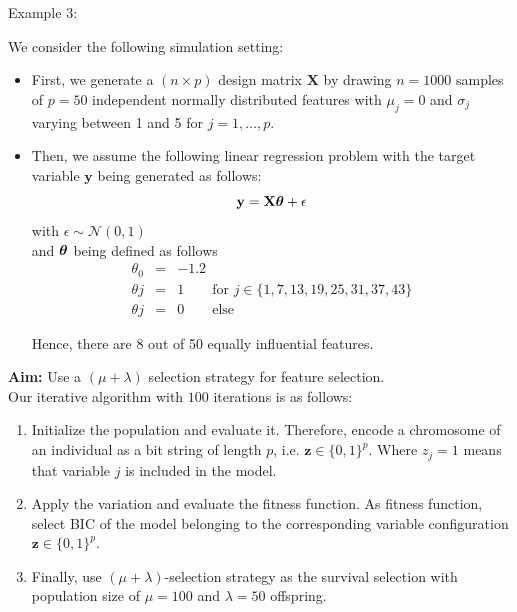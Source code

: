\documentclass[11pt,compress,t,notes=noshow, xcolor=table]{beamer}
\begin{document}
\begin{vbframe}{Example 3:}

We consider the following simulation setting:

\begin{itemize}
\item First, we generate a $(n \times p)$ design matrix $\mathbf{X}$ by drawing $n = 1000$ samples of $p = 50$ independent normally distributed features with $\mu_j = 0$ and $\sigma_j$ varying between 1 and 5 for $j = 1, \dots, p$.
\item Then, we assume the following linear regression problem with the target variable $\mathbf{y}$ being generated as follows: 
$$
\mathbf{y} = \mathbf{X}\bm{\theta} + \epsilon
$$
with $\epsilon \sim \mathcal N(0, 1)$\\
and $\bm{\theta}$ being defined as follows
\begin{eqnarray*}
\theta_{0} &=& - 1.2 \\
\theta{j} &=& 1 \qquad \text{for } j \in \{1, 7, 13, 19, 25, 31, 37, 43\} \\
\theta{j} &=& 0 \qquad \text{else}
\end{eqnarray*}

Hence, there are 8 out of 50 equally influential features.
 

\end{itemize}





\framebreak
\textbf{Aim:} Use a $(\mu + \lambda)$ selection strategy for feature selection.\\
\vspace*{0.2cm}
Our iterative algorithm with $100$ iterations is as follows:
\begin{enumerate}
\item Initialize the population and evaluate it. Therefore, encode a chromosome of an individual as a bit string of length $p$, i.e. $\textbf{z} \in \{0, 1\}^p$. Where $z_j =1$ means that variable $j$ is included in the model.
\item Apply the variation and evaluate the fitness function. As fitness function, select BIC of the model belonging to the corresponding variable configuration $\textbf{z} \in \{0, 1\}^p$.
\item Finally, use $(\mu + \lambda)$-selection strategy as the survival selection with population size of $\mu = 100$ and $\lambda =50$ offspring.
\end{enumerate}





\end{vbframe}
\end{document}
